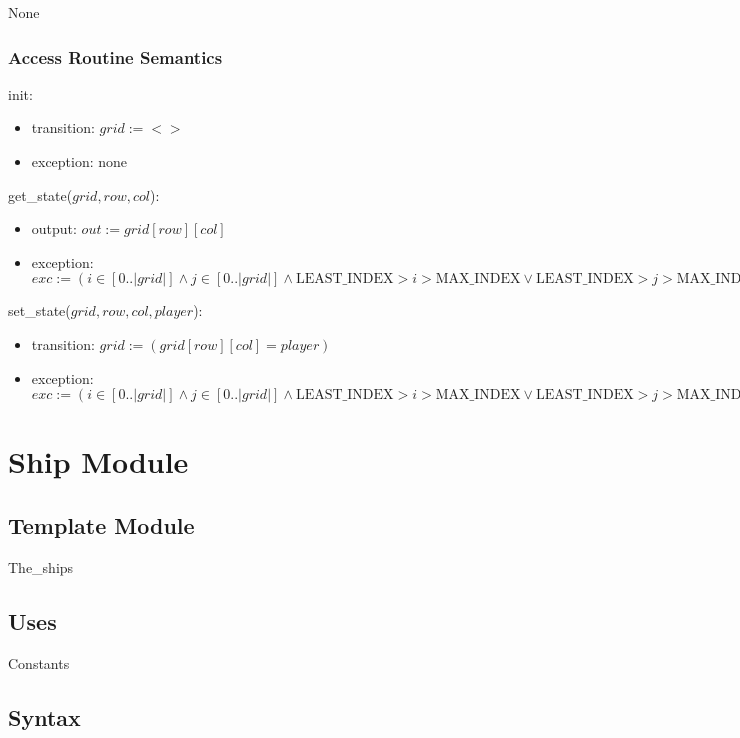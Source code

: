 \documentclass[12pt]{article}
\begin{document}
None

\subsubsection* {Access Routine Semantics}


\noindent init:
\begin{itemize}
\item transition: $grid := < >$
\item exception: none
\end{itemize}

\noindent get\_state($grid, row, col$):
\begin{itemize}
\item output: $out := grid[row][col]$
\item exception: $exc := (i \in [ 0..|grid| ]  \wedge  j  \in [ 0..|grid| ]  \wedge   \mbox{LEAST\_INDEX} > i > \mbox{MAX\_INDEX}   \vee   \mbox{LEAST\_INDEX} > j > \mbox{MAX\_INDEX} \Rightarrow \mathrm{INVALID\_SHIP\_POSITION})$
\end{itemize}

\noindent set\_state($grid, row, col, player$):
\begin{itemize}
\item transition: $grid := (grid[row][col]  = player)$
\item exception: $exc := (i \in [ 0..|grid| ]  \wedge  j  \in [ 0..|grid| ]  \wedge   \mbox{LEAST\_INDEX} > i > \mbox{MAX\_INDEX}   \vee   \mbox{LEAST\_INDEX} > j > \mbox{MAX\_INDEX} \Rightarrow \mathrm{INVALID\_SHIP\_POSITION})$
\end{itemize}


\newpage

\section* {Ship Module}

\subsection*{Template Module}

The\_ships

\subsection* {Uses}

Constants

\subsection* {Syntax}
\end{document}
